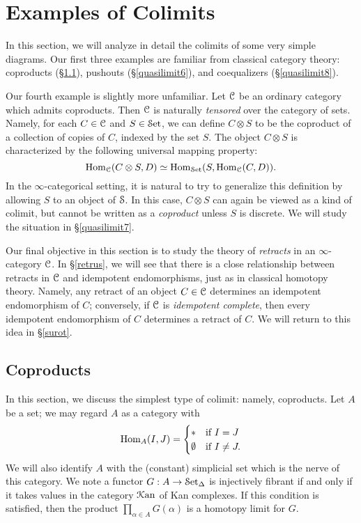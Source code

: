 \section{Examples of Colimits}\label{coexample}

\setcounter{theorem}{0}


In this section, we will analyze in detail the colimits of some very simple diagrams.
Our first three examples are familiar from classical category theory: coproducts (\S \ref{quasilimit5}), 
pushouts (\S \ref{quasilimit6}), and coequalizers (\S \ref{quasilimit8}). 

Our fourth example is slightly more unfamiliar. Let $\operatorname{\mathcal{C}}$ be an ordinary category which admits coproducts. Then $\operatorname{\mathcal{C}}$ is naturally {\em tensored} over the category of sets. Namely, for each
$C \in \operatorname{\mathcal{C}}$ and $S \in \operatorname{\mathcal{S}et}$, we can define $C \otimes S$ to be the coproduct of a collection
of copies of $C$, indexed by the set $S$. The object $C \otimes S$ is characterized by the
following universal mapping property:
$$ \operatorname{Hom}_{\operatorname{\mathcal{C}}}(C \otimes S, D) \simeq \operatorname{Hom}_{\operatorname{\mathcal{S}et}}( S, \operatorname{Hom}_{\operatorname{\mathcal{C}}}(C,D) ).$$
In the $\infty$-categorical setting, it is natural to try to generalize this definition by allowing
$S$ to an object of $\operatorname{\mathcal{S}}$. In this case, $C \otimes S$ can again be viewed as a kind of colimit, but cannot be written as a {\em coproduct} unless $S$ is discrete. We will study the situation in \S \ref{quasilimit7}.

Our final objective in this section is to study the theory of {\em retracts} in an $\infty$-category $\operatorname{\mathcal{C}}$. In \S \ref{retrus}, we will see that there is a close relationship between retracts in $\operatorname{\mathcal{C}}$ and idempotent endomorphisms, just as in classical homotopy theory. Namely, any retract of an object $C \in \operatorname{\mathcal{C}}$ determines an idempotent endomorphism of $C$; conversely, if $\operatorname{\mathcal{C}}$ is {\it idempotent complete}, then every idempotent endomorphism of $C$ determines a retract of $C$.
We will return to this idea in \S \ref{surot}.

\subsection{Coproducts}\label{quasilimit5}

In this section, we discuss the simplest type of colimit: namely, coproducts.
Let $A$ be a set; we may regard $A$ as a category with
$$ \operatorname{Hom}_{A}(I,J) = \begin{cases} \ast & \text{if } I=J \\ \emptyset & \text{if } I \neq J. \end{cases}$$
We will also identify $A$ with the (constant) simplicial set which is the nerve of this category.
We note a functor $G: A \rightarrow \operatorname{\mathcal{S}et_{\Delta}}$ is injectively fibrant if and only if it takes values in the category $\operatorname{\mathcal{K}an}$ of Kan complexes. If this condition is satisfied, then the product
$\prod_{\alpha \in A} G(\alpha)$ is a homotopy limit for $G$.

